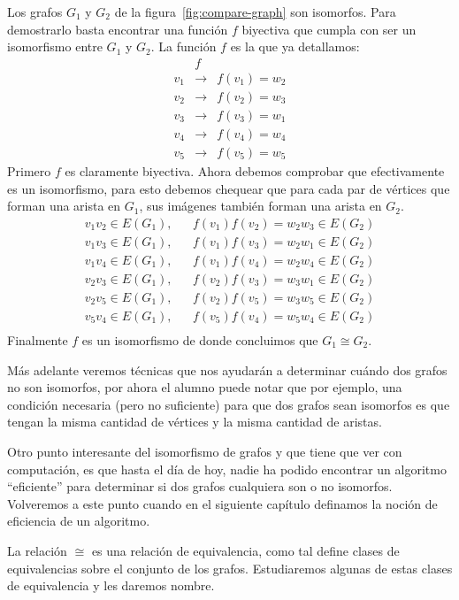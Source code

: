 \begin{ejemplo}
Los grafos $G_1$ y $G_2$ de la figura~\ref{fig:compare-graph} son isomorfos.
Para demostrarlo basta encontrar una función $f$ biyectiva que cumpla con ser un isomorfismo entre $G_1$ y $G_2$.
La función $f$ es la que ya detallamos:
\[
\begin{array}{ccc}
& f \\
v_1 & \rightarrow & f(v_1)=w_2 \\
v_2 & \rightarrow & f(v_2)=w_3 \\
v_3 & \rightarrow & f(v_3)=w_1 \\
v_4 & \rightarrow & f(v_4)=w_4 \\
v_5 & \rightarrow & f(v_5)=w_5
\end{array}
\]
Primero $f$ es claramente biyectiva.
Ahora debemos comprobar que efectivamente es un isomorfismo, para esto debemos chequear que para cada par de vértices que forman una arista en $G_1$, sus imágenes también forman una arista en $G_2$.
\[
\begin{array}{lclcccccc}
v_1v_2\in E(G_1), & & f(v_1)f(v_2)=w_2w_3 \in E(G_2) \\
v_1v_3\in E(G_1), & & f(v_1)f(v_3)=w_2w_1 \in E(G_2) \\
v_1v_4\in E(G_1), & & f(v_1)f(v_4)=w_2w_4 \in E(G_2) \\
v_2v_3\in E(G_1), & & f(v_2)f(v_3)=w_3w_1 \in E(G_2) \\
v_2v_5\in E(G_1), & & f(v_2)f(v_5)=w_3w_5 \in E(G_2) \\
v_5v_4\in E(G_1), & & f(v_5)f(v_4)=w_5w_4 \in E(G_2) \\
\end{array}
\]
Finalmente $f$ es un isomorfismo de donde concluimos que $G_1\cong G_2$.
\end{ejemplo}
Más adelante veremos técnicas que nos ayudarán a determinar cuándo dos grafos no son isomorfos, por ahora el alumno puede notar que por ejemplo, una condición necesaria (pero no suficiente) para que dos grafos sean isomorfos es que tengan la misma cantidad de vértices y la misma cantidad de aristas.

Otro punto interesante del isomorfismo de grafos y que tiene que ver con computación, es que hasta el día de hoy, nadie ha podido encontrar un algoritmo ``eficiente'' para determinar si dos grafos cualquiera son o no isomorfos.
Volveremos a este punto cuando en el siguiente capítulo definamos la noción de eficiencia de un algoritmo.

La relación $\cong$ es una relación de equivalencia, como tal define clases de equivalencias sobre el conjunto de los grafos.
Estudiaremos algunas de estas clases de equivalencia y les daremos nombre.

